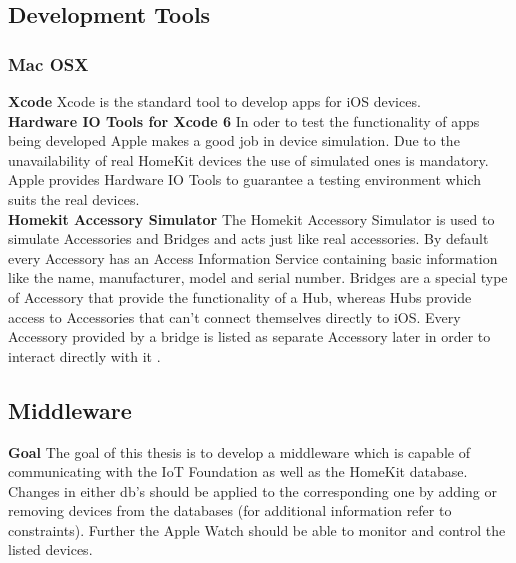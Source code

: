 
	\subsection{Development Tools} %

		\subsubsection{Mac OSX}

			\textbf{Xcode}
				Xcode is the standard tool to develop apps for iOS devices.\\

			\textbf{Hardware IO Tools for Xcode 6}
				In oder to test the functionality of apps being developed Apple makes a good job in device simulation. Due to the unavailability of real HomeKit devices the use of simulated ones is mandatory. Apple provides Hardware IO Tools to guarantee a testing environment which suits the real devices.\\

			\textbf{Homekit Accessory Simulator}
				The Homekit Accessory Simulator is used to simulate Accessories and Bridges and acts just like real accessories. By default every Accessory has an Access Information Service containing basic information like the name, manufacturer, model and serial number. Bridges are a special type of Accessory that provide the functionality of a Hub, whereas Hubs provide access to Accessories that can't connect themselves directly to iOS. Every Accessory provided by a bridge is listed as separate Accessory later in order to interact directly with it \parencite{IntroToHomeKit}.\\



	\subsection{Middleware}
		\textbf{Goal} The goal of this thesis is to develop a middleware which is capable of communicating with the IoT Foundation as well as the HomeKit database. Changes in either db's should be applied to the corresponding one by adding or removing devices from the databases (for additional information refer to constraints). Further the Apple Watch should be able to monitor and control the listed devices.

	\pagebreak
